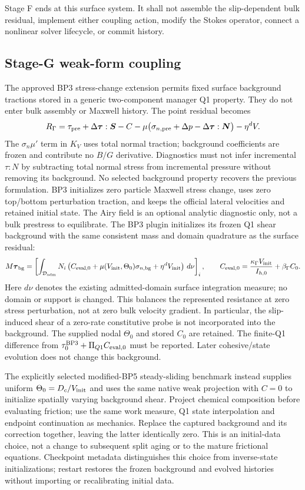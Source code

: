 \documentclass[11pt]{article}
\begin{document}
Stage F ends at this surface system.  It shall not assemble the
slip-dependent bulk residual, implement either coupling action, modify the
Stokes operator, connect a nonlinear solver lifecycle, or commit history.

\subsection{Stage-G weak-form coupling}

The approved BP3 stress-change extension permits fixed surface background
tractions stored in a generic two-component manager Q1 property. They do not
enter bulk assembly or Maxwell history. The point residual becomes
\[
 R_\Gamma=\tau_{\rm pre}+\Delta\boldsymbol\tau:\boldsymbol S-C
 -\mu\bigl(\sigma_{n,\rm pre}+\Delta p
                  -\Delta\boldsymbol\tau:\boldsymbol N\bigr)-\eta^d V.
\]
The $\sigma_n\mu'$ term in $K_V$ uses total normal traction; background
coefficients are frozen and contribute no $B/G$ derivative. Diagnostics must
not infer incremental $\tau:N$ by subtracting total normal stress from
incremental pressure without removing its background. No selected background
property recovers the previous formulation. BP3 initializes zero particle
Maxwell stress change, uses zero top/bottom perturbation traction, and keeps
the official lateral velocities and retained initial state. The Airy field
is an optional analytic diagnostic only, not a bulk prestress to equilibrate.
The BP3 plugin initializes its frozen Q1 shear background with the same
consistent mass and domain quadrature as the surface residual:
\[
 M\boldsymbol\tau_{\rm bg}
 =\left[\int_{\mathcal D_{\rm adm}} N_i
 \left(C_{\rm eval,0}+\mu(V_{\rm init},\Theta_0)\sigma_{n,\rm bg}
                   +\eta^d V_{\rm init}\right)\,d\nu\right]_i,
 \qquad C_{\rm eval,0}=\frac{\kappa_\Gamma V_{\rm init}}{I_{h,0}}
                         +\beta_\Gamma C_0.
\]
Here $d\nu$ denotes the existing admitted-domain surface integration measure;
no domain or support is changed. This balances the represented resistance at
zero stress perturbation, not at zero bulk velocity gradient. In particular,
the slip-induced shear of a zero-rate constitutive probe is not incorporated
into the background. The supplied nodal $\Theta_0$ and stored $C_0$ are retained.
The finite-Q1 difference from $\tau_0^{\rm BP3}+\Pi_{Q1} C_{\rm eval,0}$
must be reported. Later cohesive/state evolution does not change this background.

The explicitly selected modified-BP5 steady-sliding benchmark instead supplies
uniform $\Theta_0=D_c/V_{\rm init}$ and uses the same native weak projection
with $C=0$ to initialize spatially varying background shear.  Project chemical
composition before evaluating friction; use the same work measure, Q1 state
interpolation and endpoint continuation as mechanics.  Replace the captured
background and its correction together, leaving the latter identically zero.
This is an initial-data choice, not a change to subsequent split aging or to
the mature frictional equations.  Checkpoint metadata distinguishes this
choice from inverse-state initializations; restart restores the frozen
background and evolved histories without importing or recalibrating initial
data.
\end{document}
